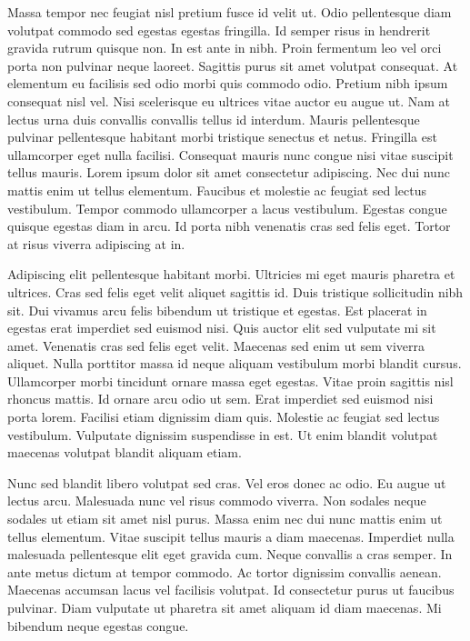 \documentclass[11pt,a4paper]{article}
\begin{document}
Massa tempor nec feugiat nisl pretium fusce id velit ut. Odio pellentesque diam volutpat commodo sed egestas egestas fringilla. Id semper risus in hendrerit gravida rutrum quisque non. In est ante in nibh. Proin fermentum leo vel orci porta non pulvinar neque laoreet. Sagittis purus sit amet volutpat consequat. At elementum eu facilisis sed odio morbi quis commodo odio. Pretium nibh ipsum consequat nisl vel. Nisi scelerisque eu ultrices vitae auctor eu augue ut. Nam at lectus urna duis convallis convallis tellus id interdum. Mauris pellentesque pulvinar pellentesque habitant morbi tristique senectus et netus. Fringilla est ullamcorper eget nulla facilisi. Consequat mauris nunc congue nisi vitae suscipit tellus mauris. Lorem ipsum dolor sit amet consectetur adipiscing. Nec dui nunc mattis enim ut tellus elementum. Faucibus et molestie ac feugiat sed lectus vestibulum. Tempor commodo ullamcorper a lacus vestibulum. Egestas congue quisque egestas diam in arcu. Id porta nibh venenatis cras sed felis eget. Tortor at risus viverra adipiscing at in.

Adipiscing elit pellentesque habitant morbi. Ultricies mi eget mauris pharetra et ultrices. Cras sed felis eget velit aliquet sagittis id. Duis tristique sollicitudin nibh sit. Dui vivamus arcu felis bibendum ut tristique et egestas. Est placerat in egestas erat imperdiet sed euismod nisi. Quis auctor elit sed vulputate mi sit amet. Venenatis cras sed felis eget velit. Maecenas sed enim ut sem viverra aliquet. Nulla porttitor massa id neque aliquam vestibulum morbi blandit cursus. Ullamcorper morbi tincidunt ornare massa eget egestas. Vitae proin sagittis nisl rhoncus mattis. Id ornare arcu odio ut sem. Erat imperdiet sed euismod nisi porta lorem. Facilisi etiam dignissim diam quis. Molestie ac feugiat sed lectus vestibulum. Vulputate dignissim suspendisse in est. Ut enim blandit volutpat maecenas volutpat blandit aliquam etiam.

Nunc sed blandit libero volutpat sed cras. Vel eros donec ac odio. Eu augue ut lectus arcu. Malesuada nunc vel risus commodo viverra. Non sodales neque sodales ut etiam sit amet nisl purus. Massa enim nec dui nunc mattis enim ut tellus elementum. Vitae suscipit tellus mauris a diam maecenas. Imperdiet nulla malesuada pellentesque elit eget gravida cum. Neque convallis a cras semper. In ante metus dictum at tempor commodo. Ac tortor dignissim convallis aenean. Maecenas accumsan lacus vel facilisis volutpat. Id consectetur purus ut faucibus pulvinar. Diam vulputate ut pharetra sit amet aliquam id diam maecenas. Mi bibendum neque egestas congue.
\end{document}
